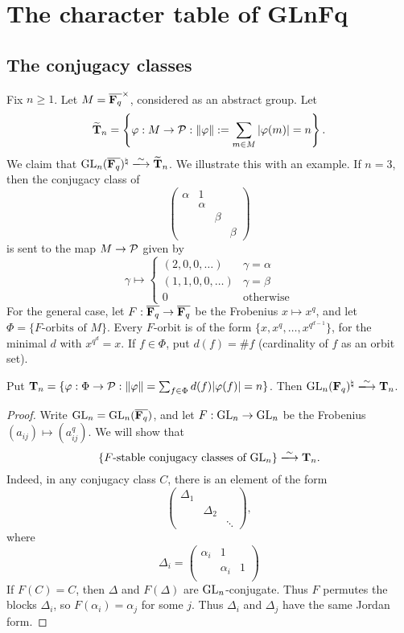 \documentclass{article}
\begin{document}
\section{The character table of \texorpdfstring{GLnFq}{$\generallinear_n(\dF_q)$}}


\subsection{The conjugacy classes}

Fix $n\geqslant 1$. Let $M=\overline{\mathbf{F}_q}^\times$, considered as an abstract 
group. Let 
\[
  \widetilde{\mathbf{T}}_n = \left\{\varphi:M\to \mathcal{P}:\|\varphi\| := \sum_{m\in M} |\varphi(m)| = n\right\} . 
\]
We claim that $\generallinear_n(\overline{\dF_q})^\natural \isomorphism \widetilde\dT_n$. 
We illustrate this with an example. If $n=3$, then the conjugacy class of 
\[
  \begin{pmatrix} \alpha & 1 \\ & \alpha \\ & & \beta \\ & & & \beta \end{pmatrix}
\]
is sent to the map $M\to \mathcal{P}$ given by 
\[
  \gamma\mapsto 
  \begin{cases}
    (2,0,0,\dots) & \gamma = \alpha \\ 
    (1,1,0,0,\dots) & \gamma = \beta \\
    0 & \text{otherwise} 
  \end{cases}
\]
For the general case, let $F:\overline{\mathbf{F}_q} \to \overline{\mathbf{F}_q}$ be the Frobenius 
$x\mapsto x^q$, and let $\Phi=\{\text{$F$-orbits of $M$}\}$. Every $F$-orbit is 
of the form $\{x,x^q,\dots,x^{q^{d-1}}\}$, for the minimal $d$ with 
$x^{q^d} = x$. If $f\in \Phi$, put 
$d(f) = \# f$ (cardinality of $f$ as an orbit set). 

\begin{proposition}
Put $\mathbf{T}_n = \{\varphi:\Phi\to \mathcal{P}:\|\varphi\| = \sum_{f\in \Phi} d(f)|\varphi(f)| = n\}$. 
Then $\generallinear_n(\dF_q)^\natural \isomorphism \dT_n$. 
\end{proposition}
\begin{proof}
Write $\operatorname{GL}_n = \operatorname{GL}_n(\overline{\mathbf{F}_q})$, and 
let $F:\operatorname{GL}_n\to \operatorname{GL}_n$ be the Frobenius 
$(a_{i j})\mapsto (a_{i j}^q)$. We will show that 
\[
  \{\text{$F$-stable conjugacy classes of $\generallinear_n$}\}\isomorphism \dT_n .
\]
Indeed, in any conjugacy class $C$, there is an element of the form 
\[
  \begin{pmatrix} \Delta_1 \\ & \Delta_2 \\ & & \ddots \end{pmatrix} ,
\]
where 
\[
  \Delta_i = \begin{pmatrix} \alpha_i & 1 \\ & \alpha_i & 1 \\ \end{pmatrix}
\]
If $F(C)=C$, then $\Delta$ and $F(\Delta)$ are $\operatorname{GL}_n$-conjugate. Thus 
$F$ permutes the blocks $\Delta_i$, so $F(\alpha_i) = \alpha_j$ for some $j$. Thus 
$\Delta_i$ and $\Delta_j$ have the same Jordan form. 
\end{proof}
\end{document}
